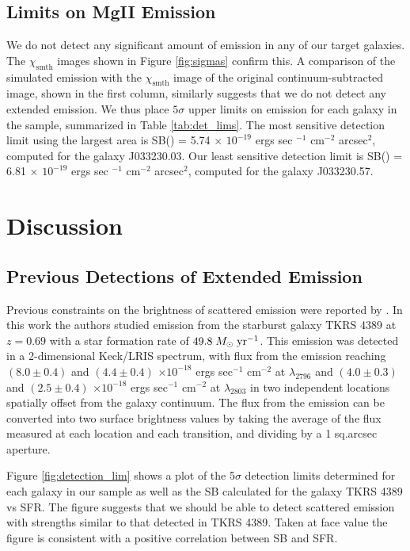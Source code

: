 \documentclass[twocolumn]{aastex61}
\def \msunperyr {{\; M_{\odot}\rm \;yr^{-1}}}
\begin{document}
\subsection{Limits on MgII Emission}
We do not detect any significant amount of  emission in any of our target galaxies. The $\chi_{\text{smth}}$ images shown in Figure \ref{fig:sigmas} confirm this. A comparison of the simulated emission with the $\chi_{\text{smth}}$ image of the original continuum-subtracted image, shown in the first column, similarly suggests that we do not detect any extended  emission. We thus place $5\sigma$ upper limits on  emission for each galaxy in the sample, summarized in Table \ref{tab:det_lims}. The most sensitive detection limit using the largest area is SB() = 5.74 $\times$ $10^{-19}$ ergs sec $^{-1}$ cm$^{-2}$ arcsec$^2$, computed for the galaxy J033230.03. Our least sensitive detection limit is SB() = 6.81 $\times$ $10^{-19}$ ergs sec $^{-1}$ cm$^{-2}$ arcsec$^2$, computed for the galaxy J033230.57.

\section{Discussion}\label{sec:discussion}

\subsection{Previous Detections of Extended  Emission}
Previous constraints on the brightness of scattered  emission were reported by \cite{Rubin_2011}. In this work the authors studied emission from the starburst galaxy TKRS 4389 at $z = 0.69$ with a star formation rate of $49.8\msunperyr$. This emission was detected in a 2-dimensional Keck/LRIS spectrum, with flux from the emission reaching $(8.0 \pm 0.4)$ and $(4.4 \pm 0.4)$ $\times10^{-18}$ ergs sec$^{-1}$ cm$^{-2}$ at  $\lambda _{2796}$ and $(4.0 \pm 0.3)$ and $(2.5 \pm 0.4)$ $\times10^{-18}$ ergs sec$^{-1}$ cm$^{-2}$ at $\lambda_{2803}$ in two independent locations spatially offset from the galaxy continuum. The flux from the emission can be converted into two surface brightness values by taking the average of the flux measured at each location and each transition, and dividing by a 1 sq.arcsec aperture. 

Figure \ref{fig:detection_lim} shows a plot of the 5$\sigma$ detection limits determined for each galaxy in our sample as well as the SB calculated for the galaxy TKRS 4389 vs SFR. The figure suggests that we should be able to detect scattered  emission with strengths similar to that detected in TKRS 4389. Taken at face value the figure is consistent with a positive correlation between  SB and SFR. 
\end{document}
